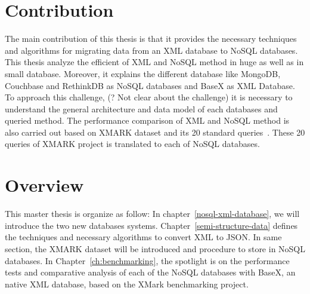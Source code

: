 	\section{Contribution}
		The main contribution of this thesis is that it provides the necessary techniques and algorithms for migrating data from an XML database to NoSQL databases.  This thesis analyze the efficient of XML and NoSQL method in huge as well as in small database.  Moreover, it explains the different database like MongoDB, Couchbase and RethinkDB as NoSQL databases and BaseX as XML Database. To approach this challenge, (? Not clear about the challenge) it is necessary to understand the general architecture and data model of each databases and queried method. The performance comparison of XML and NoSQL method is also carried out based on XMARK dataset and its 20 standard queries~\citep{xmark/original}. These 20 queries of XMARK project is translated to each of NoSQL databases.
	\section{Overview }
		This master thesis is organize as follow: In chapter~\ref{nosql-xml-database}, we will introduce the two new databases systems. Chapter~\ref{semi-structure-data} defines the techniques and necessary algorithms to convert XML  to JSON. In same section, the XMARK dataset will be introduced and procedure to store in NoSQL databases. In Chapter~\ref{ch:benchmarking}, the spotlight is on the performance tests and comparative analysis of each of the NoSQL databases with BaseX, an native XML database, based on the XMark benchmarking project.		
	